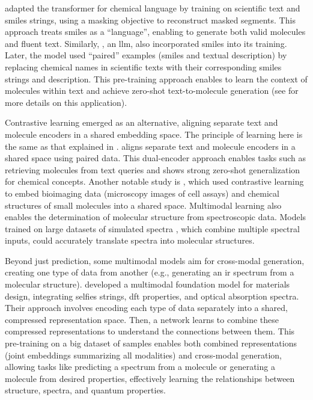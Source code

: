 \autocite{edwards2022translation} adapted the  transformer for chemical language by training on scientific text and \gls{smiles} strings, using a masking objective to reconstruct masked segments. 
This approach treats \gls{smiles} as a \enquote{language}, enabling   to generate both valid molecules and fluent text. 
Similarly,  \autocite{taylor2022galactica}, an \gls{llm}, also incorporated \gls{smiles} into its training. Later, the \autocite{liu2023molxpt0} model used \enquote{paired} examples (\gls{smiles} and textual description) by replacing chemical names in scientific texts with their corresponding \gls{smiles} strings and description. 
This pre-training approach enables  to learn the context of molecules within text and achieve zero-shot text-to-molecule generation (see  for more details on this application).

Contrastive learning emerged as an alternative, aligning separate text and molecule encoders in a shared embedding space. 
The principle of learning here is the same as that explained in .  \autocite{Liu2023multi0modal} aligns separate text and molecule encoders in a shared space using paired data. 
This dual-encoder approach enables tasks such as retrieving molecules from text queries and shows strong zero-shot generalization for chemical concepts.  
Another notable study is  \autocite{sanchez2023cloome}, which used contrastive learning to embed bioimaging data (microscopy images of cell assays) and chemical structures of small molecules into a shared space. 
Multimodal learning also enables the determination of molecular structure from spectroscopic data. 
Models trained on large datasets of simulated spectra \autocite{alberts2024unraveling}, which combine multiple spectral inputs, could accurately translate spectra into molecular structures. \autocite{chacko2024spectro,mirza2024elucidating}


Beyond just prediction, some multimodal models aim for cross-modal generation, creating one type of data from another (e.g., generating an \gls{ir} spectrum from a molecular structure). \textcite{takeda2023multi} developed a multimodal foundation model for materials design, integrating \gls{selfies} strings, \gls{dft} properties, and optical absorption spectra. 
Their approach involves encoding each type of data separately into a shared, compressed representation space. 
Then, a network learns to combine these compressed representations to understand the connections between them. 
This pre-training on a big dataset of samples enables both combined representations (joint embeddings summarizing all modalities) and cross-modal generation, allowing tasks like predicting a spectrum from a molecule or generating a molecule from desired properties, effectively learning the relationships between structure, spectra, and quantum properties.

